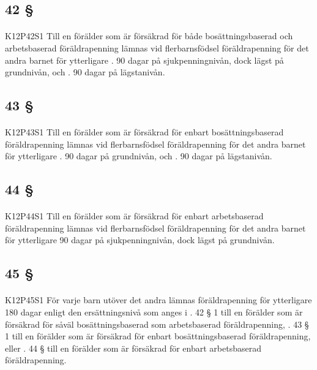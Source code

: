 \documentclass[a4paper,notitlepage,openany,10pt]{book}
\begin{document}
\subsection*{42 §}
\paragraph*{}
{\tiny K12P42S1}
Till en förälder som är försäkrad för både bosättningsbaserad och arbetsbaserad föräldrapenning lämnas vid flerbarnsfödsel föräldrapenning för det andra barnet för ytterligare
. 90 dagar på sjukpenningnivån, dock lägst på grundnivån, och
. 90 dagar på lägstanivån.
\subsection*{43 §}
\paragraph*{}
{\tiny K12P43S1}
Till en förälder som är försäkrad för enbart bosättningsbaserad föräldrapenning lämnas vid flerbarnsfödsel föräldrapenning för det andra barnet för ytterligare
. 90 dagar på grundnivån, och
. 90 dagar på lägstanivån.
\subsection*{44 §}
\paragraph*{}
{\tiny K12P44S1}
Till en förälder som är försäkrad för enbart arbetsbaserad föräldrapenning lämnas vid flerbarnsfödsel föräldrapenning för det andra barnet för ytterligare 90 dagar på sjukpenningnivån, dock lägst på grundnivån.
\subsection*{45 §}
\paragraph*{}
{\tiny K12P45S1}
För varje barn utöver det andra lämnas föräldrapenning för ytterligare 180 dagar enligt den ersättningsnivå som anges i
. 42 § 1 till en förälder som är försäkrad för såväl bosättningsbaserad som arbetsbaserad föräldrapenning,
. 43 § 1 till en förälder som är försäkrad för enbart bosättningsbaserad föräldrapenning, eller
. 44 § till en förälder som är försäkrad för enbart arbetsbaserad föräldrapenning.
\end{document}
